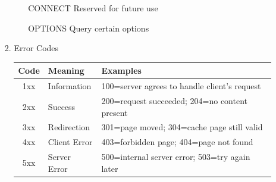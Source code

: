\documentclass[a4paper,10pt]{article}
\begin{document}
\begin{enumerate}
\begin{enumerate}
\begin{enumerate}
\begin{itemize}
              \item [CONNECT] Reserved for future use
              \item [OPTIONS] Query certain options
            \end{itemize}
          \item Error Codes
            \newline\begin{tabular}{c | l | l}
              Code & Meaning & Examples \\ \hline
              1xx & Information & 100=server agrees to handle client's request \\
              2xx & Success & 200=request succeeded; 204=no content present \\
              3xx & Redirection & 301=page moved; 304=cache page still valid \\
              4xx & Client Error & 403=forbidden page; 404=page not found \\
              5xx & Server Error & 500=internal server error; 503=try again later
            \end{tabular}
        \end{enumerate}
    \end{enumerate}
    

\end{enumerate}
\end{document}
